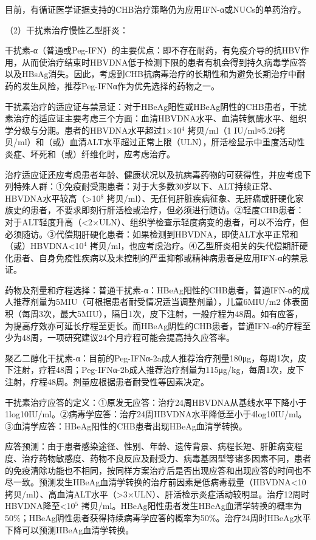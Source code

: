 目前，有循证医学证据支持的CHB治疗策略仍为应用IFN-α或NUCs的单药治疗。

（2）干扰素治疗慢性乙型肝炎：

干扰素-α（普通或Peg-IFN）的主要优点：即不存在耐药，有免疫介导的抗HBV作用，从而使治疗结束时HBVDNA低于检测下限的患者有机会得到持久病毒学应答以及HBsAg消失。因此，考虑到CHB抗病毒治疗的长期性和为避免长期治疗中耐药的发生风险，推荐Peg-IFNα作为优先选择的药物之一。

干扰素治疗的适应证与禁忌证：对于HBeAg阳性或HBeAg阴性的CHB患者，干扰素治疗的适应证主要考虑三个方面：血清HBVDNA水平、血清转氨酶水平、组织学分级与分期。患者的HBVDNA水平超过1×10$^{4}$
拷贝/ml（1
IU/ml≈5.26拷贝/ml）和（或）血清ALT水平超过正常上限（ULN），肝活检显示中重度活动性炎症、坏死和（或）纤维化时，应考虑治疗。

治疗适应证还应考虑患者年龄、健康状况以及抗病毒药物的可获得性，并应考虑下列特殊人群：①免疫耐受期患者：对于大多数30岁以下、ALT持续正常、HBVDNA水平较高（\textgreater{}10$^{8}$
拷贝/ml）、无任何肝脏疾病征象、无肝癌或肝硬化家族史的患者，不要求即刻行肝活检或治疗，但必须进行随访。②轻度CHB患者：对于ALT轻度升高（\textless{}2×ULN）、组织学检查示轻度病变的患者，可以不治疗，但必须随访。③代偿期肝硬化患者：如果检测到HBVDNA，即使ALT水平正常和（或）HBVDNA\textless{}10$^{4}$
拷贝/ml，也应考虑治疗。④乙型肝炎相关的失代偿期肝硬化患者、自身免疫性疾病以及未控制的严重抑郁或精神病患者是应用IFN-α的禁忌证。

药物及剂量和疗程选择：普通干扰素-α：HBeAg阳性的CHB患者，普通IFN-α的成人推荐剂量为5MIU（可根据患者耐受情况适当调整剂量），儿童6MIU/m{2}
体表面积（每周3次，最大5MIU），隔日1次，皮下注射，一般疗程为48周。如有应答，为提高疗效亦可延长疗程至更长。而HBeAg阴性的CHB患者，普通IFN-α的疗程至少为48周，一项研究建议24个月疗程可能会提高持久应答率。

聚乙二醇化干扰素-α：目前的Peg-IFNα-2a成人推荐治疗剂量180μg，每周1次，皮下注射，疗程48周；Peg-IFNα-2b成人推荐治疗剂量为115μg/kg，每周1次，皮下注射，疗程48周。剂量应根据患者耐受性等因素决定。

干扰素治疗应答的定义：①原发无应答：治疗24周HBVDNA从基线水平下降小于1log10IU/ml。②病毒学应答：治疗24周HBVDNA水平降低至小于4log10IU/ml。③血清学应答：HBeAg阳性的CHB患者出现HBeAg血清学转换。

应答预测：由于患者感染途径、性别、年龄、遗传背景、病程长短、肝脏病变程度、治疗药物敏感度、药物不良反应及耐受力、病毒基因型等诸多因素不同，患者的免疫清除功能也不相同，按同样方案治疗后是否出现应答和出现应答的时间也不尽一致。预测发生HBeAg血清学转换的治疗前因素是低病毒载量（HBVDNA\textless{}10拷贝/ml）、高血清ALT水平（\textgreater{}3×ULN）、肝活检示炎症活动较明显。治疗12周时HBVDNA降至\textless{}10$^{5}$
拷贝/ml。HBeAg阳性患者发生HBeAg血清学转换的概率为50\%；HBeAg阴性患者获得持续病毒学应答的概率为50\%。治疗24周时HBeAg水平下降可以预测HBeAg血清学转换。

